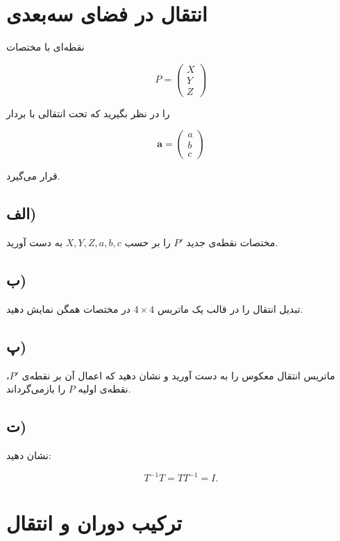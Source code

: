 \documentclass[a4paper,16pt]{article}
\begin{document}
	\section{انتقال در فضای سه‌بعدی}
	
	نقطه‌ای با مختصات
	
	\[
	P=
	\begin{pmatrix}
		X\\
		Y\\
		Z
	\end{pmatrix}
	\]
	
	را در نظر بگیرید که تحت انتقالی با بردار
	
	\[
	\mathbf{a}=
	\begin{pmatrix}
		a\\
		b\\
		c
	\end{pmatrix}
	\]
	
	قرار می‌گیرد.
	
	\subsection*{الف)}
	
	مختصات نقطه‌ی جدید $P'$ را بر حسب $X,Y,Z,a,b,c$ به دست آورید.
	
	\subsection*{ب)}
	
	تبدیل انتقال را در قالب یک ماتریس $4\times4$ در مختصات همگن نمایش دهید.
	
	\subsection*{پ)}
	
	ماتریس انتقال معکوس را به دست آورید و نشان دهید که اعمال آن بر نقطه‌ی $P'$، نقطه‌ی اولیه $P$ را بازمی‌گرداند.
	
	\subsection*{ت)}
	
	نشان دهید:
	
	\[
	T^{-1}T=TT^{-1}=I.
	\]
	
	
	
	\section{ترکیب دوران و انتقال}
	
\end{document}
